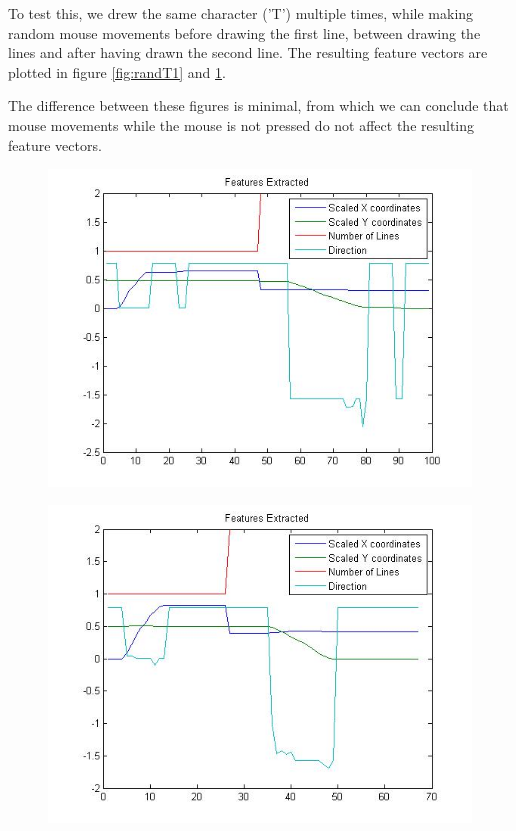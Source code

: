 To test this, we drew the same character ('T') multiple times, while making random mouse movements before drawing the first line, between drawing the lines and after having drawn the second line. The resulting feature vectors are plotted in figure \ref{fig:randT1} and \ref{fig:randT2}.

The difference between these figures is minimal, from which we can conclude that mouse movements while the mouse is not pressed do not affect the resulting feature vectors.

\begin{figure}[H]
	\centering
	\begin{minipage}{.4\textwidth}
		\centering
		\includegraphics[width=.99\linewidth]{images/deepas/T_random1}
		\label{fig:randT1}
	\end{minipage}
	\begin{minipage}{.4\textwidth}
		\centering
		\includegraphics[width=.99\linewidth]{images/deepas/T_random2}
		\label{fig:randT2}
	\end{minipage}
\end{figure}

